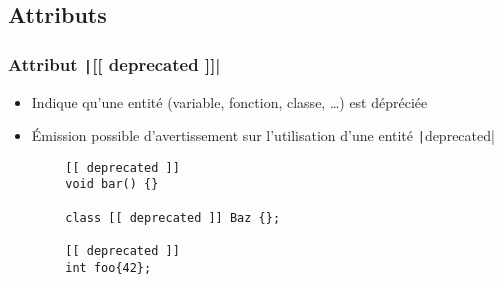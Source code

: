 \documentclass[C++.tex]{subfiles}
\begin{document}
\subsection*{Attributs}
\begin{frame}[fragile]
	\frametitle{Attribut \texttt|[[ deprecated ]]|}
	\begin{itemize}
		\item Indique qu'une entité (variable, fonction, classe, \ldots{}) est dépréciée
		\item Émission possible d'avertissement sur l'utilisation d'une entité \texttt|deprecated|

	\end{itemize}

	\begin{verbatim}
		[[ deprecated ]]
		void bar() {}

		class [[ deprecated ]] Baz {};

		[[ deprecated ]]
		int foo{42};
	\end{verbatim}
\end{frame}
\end{document}
